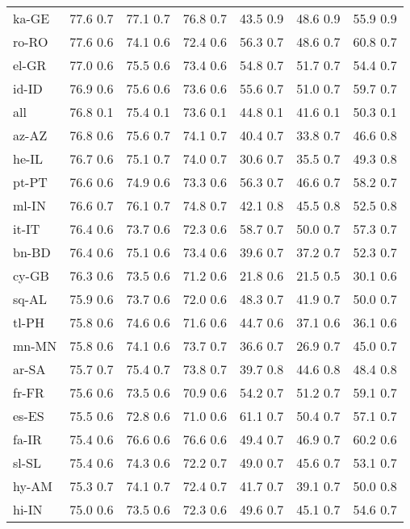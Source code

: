 \documentclass[11pt]{article}
\begin{document}
\begin{table*}[]
{\begin{tabular}{lcccccc}
ka-GE & 77.6  0.7 & 77.1  0.7 & 76.8  0.7 & 43.5  0.9 & 48.6  0.9 & 55.9  0.9 \\
ro-RO & 77.6  0.6 & 74.1  0.6 & 72.4  0.6 & 56.3  0.7 & 48.6  0.7 & 60.8  0.7 \\
el-GR & 77.0  0.6 & 75.5  0.6 & 73.4  0.6 & 54.8  0.7 & 51.7  0.7 & 54.4  0.7 \\
id-ID & 76.9  0.6 & 75.6  0.6 & 73.6  0.6 & 55.6  0.7 & 51.0  0.7 & 59.7  0.7 \\
all & 76.8  0.1 & 75.4  0.1 & 73.6  0.1 & 44.8  0.1 & 41.6  0.1 & 50.3  0.1 \\
az-AZ & 76.8  0.6 & 75.6  0.7 & 74.1  0.7 & 40.4  0.7 & 33.8  0.7 & 46.6  0.8 \\
he-IL & 76.7  0.6 & 75.1  0.7 & 74.0  0.7 & 30.6  0.7 & 35.5  0.7 & 49.3  0.8 \\
pt-PT & 76.6  0.6 & 74.9  0.6 & 73.3  0.6 & 56.3  0.7 & 46.6  0.7 & 58.2  0.7 \\
ml-IN & 76.6  0.7 & 76.1  0.7 & 74.8  0.7 & 42.1  0.8 & 45.5  0.8 & 52.5  0.8 \\
it-IT & 76.4  0.6 & 73.7  0.6 & 72.3  0.6 & 58.7  0.7 & 50.0  0.7 & 57.3  0.7 \\
bn-BD & 76.4  0.6 & 75.1  0.6 & 73.4  0.6 & 39.6  0.7 & 37.2  0.7 & 52.3  0.7 \\
cy-GB & 76.3  0.6 & 73.5  0.6 & 71.2  0.6 & 21.8  0.6 & 21.5  0.5 & 30.1  0.6 \\
sq-AL & 75.9  0.6 & 73.7  0.6 & 72.0  0.6 & 48.3  0.7 & 41.9  0.7 & 50.0  0.7 \\
tl-PH & 75.8  0.6 & 74.6  0.6 & 71.6  0.6 & 44.7  0.6 & 37.1  0.6 & 36.1  0.6 \\
mn-MN & 75.8  0.6 & 74.1  0.6 & 73.7  0.7 & 36.6  0.7 & 26.9  0.7 & 45.0  0.7 \\
ar-SA & 75.7  0.7 & 75.4  0.7 & 73.8  0.7 & 39.7  0.8 & 44.6  0.8 & 48.4  0.8 \\
fr-FR & 75.6  0.6 & 73.5  0.6 & 70.9  0.6 & 54.2  0.7 & 51.2  0.7 & 59.1  0.7 \\
es-ES & 75.5  0.6 & 72.8  0.6 & 71.0  0.6 & 61.1  0.7 & 50.4  0.7 & 57.1  0.7 \\
fa-IR & 75.4  0.6 & 76.6  0.6 & 76.6  0.6 & 49.4  0.7 & 46.9  0.7 & 60.2  0.6 \\
sl-SL & 75.4  0.6 & 74.3  0.6 & 72.2  0.7 & 49.0  0.7 & 45.6  0.7 & 53.1  0.7 \\
hy-AM & 75.3  0.7 & 74.1  0.7 & 72.4  0.7 & 41.7  0.7 & 39.1  0.7 & 50.0  0.8 \\
hi-IN & 75.0  0.6 & 73.5  0.6 & 72.3  0.6 & 49.6  0.7 & 45.1  0.7 & 54.6  0.7 \\

\end{tabular}}
\end{table*}
\end{document}
